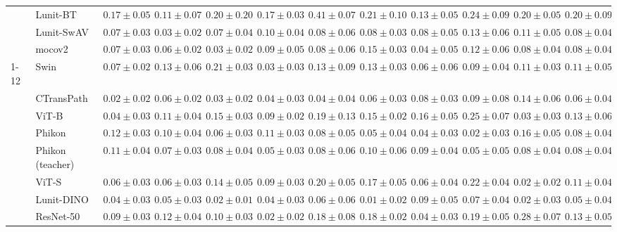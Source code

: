 \begin{tabular}{ll|cccc|c|cccc|c}
 & Lunit-BT & $0.17 \pm 0.05$ & $0.11 \pm 0.07$ & $0.20 \pm 0.20$ & $0.17 \pm 0.03$ & $0.41 \pm 0.07$ & $0.21 \pm 0.10$ & $0.13 \pm 0.05$ & $0.24 \pm 0.09$ & $0.20 \pm 0.05$ & $0.20 \pm 0.09$ \\
 & Lunit-SwAV & $0.07 \pm 0.03$ & $0.03 \pm 0.02$ & $0.07 \pm 0.04$ & $0.10 \pm 0.04$ & $0.08 \pm 0.06$ & $0.08 \pm 0.03$ & $0.08 \pm 0.05$ & $0.13 \pm 0.06$ & $0.11 \pm 0.05$ & $0.08 \pm 0.04$ \\
 & mocov2 & $0.07 \pm 0.03$ & $0.06 \pm 0.02$ & $0.03 \pm 0.02$ & $0.09 \pm 0.05$ & $0.08 \pm 0.06$ & $0.15 \pm 0.03$ & $\mathbf{0.04 \pm 0.05}$ & $0.12 \pm 0.06$ & $0.08 \pm 0.04$ & $0.08 \pm 0.04$ \\
\cline{1-12}
\multirow[t]{12}{*}{Transformer} & Swin & $0.07 \pm 0.02$ & $0.13 \pm 0.06$ & $0.21 \pm 0.03$ & $0.03 \pm 0.03$ & $0.13 \pm 0.09$ & $0.13 \pm 0.03$ & $0.06 \pm 0.06$ & $0.09 \pm 0.04$ & $0.11 \pm 0.03$ & $0.11 \pm 0.05$ \\
 & CTransPath & $\mathbf{0.02 \pm 0.02}$ & $0.06 \pm 0.02$ & $0.03 \pm 0.02$ & $0.04 \pm 0.03$ & $\mathbf{0.04 \pm 0.04}$ & $0.06 \pm 0.03$ & $0.08 \pm 0.03$ & $0.09 \pm 0.08$ & $0.14 \pm 0.06$ & $0.06 \pm 0.04$ \\
 & ViT-B & $0.04 \pm 0.03$ & $0.11 \pm 0.04$ & $0.15 \pm 0.03$ & $0.09 \pm 0.02$ & $0.19 \pm 0.13$ & $0.15 \pm 0.02$ & $0.16 \pm 0.05$ & $0.25 \pm 0.07$ & $0.03 \pm 0.03$ & $0.13 \pm 0.06$ \\
 & Phikon & $0.12 \pm 0.03$ & $0.10 \pm 0.04$ & $0.06 \pm 0.03$ & $0.11 \pm 0.03$ & $0.08 \pm 0.05$ & $0.05 \pm 0.04$ & $0.04 \pm 0.03$ & $\mathbf{0.02 \pm 0.03}$ & $0.16 \pm 0.05$ & $0.08 \pm 0.04$ \\
 & Phikon (teacher) & $0.11 \pm 0.04$ & $0.07 \pm 0.03$ & $0.08 \pm 0.04$ & $0.05 \pm 0.03$ & $0.08 \pm 0.06$ & $0.10 \pm 0.06$ & $0.09 \pm 0.04$ & $0.05 \pm 0.05$ & $0.08 \pm 0.04$ & $0.08 \pm 0.04$ \\
 & ViT-S & $0.06 \pm 0.03$ & $0.06 \pm 0.03$ & $0.14 \pm 0.05$ & $0.09 \pm 0.03$ & $0.20 \pm 0.05$ & $0.17 \pm 0.05$ & $0.06 \pm 0.04$ & $0.22 \pm 0.04$ & $\mathbf{0.02 \pm 0.02}$ & $0.11 \pm 0.04$ \\
 & Lunit-DINO & $0.04 \pm 0.03$ & $0.05 \pm 0.03$ & $0.02 \pm 0.01$ & $0.04 \pm 0.03$ & $0.06 \pm 0.06$ & $\mathbf{0.01 \pm 0.02}$ & $0.09 \pm 0.05$ & $0.07 \pm 0.04$ & $0.02 \pm 0.03$ & $\mathbf{0.05 \pm 0.04}$ \\
 & ResNet-50 & $0.09 \pm 0.03$ & $0.12 \pm 0.04$ & $0.10 \pm 0.03$ & $\mathbf{0.02 \pm 0.02}$ & $0.18 \pm 0.08$ & $0.18 \pm 0.02$ & $0.04 \pm 0.03$ & $0.19 \pm 0.05$ & $0.28 \pm 0.07$ & $0.13 \pm 0.05$ \\

\end{tabular}
